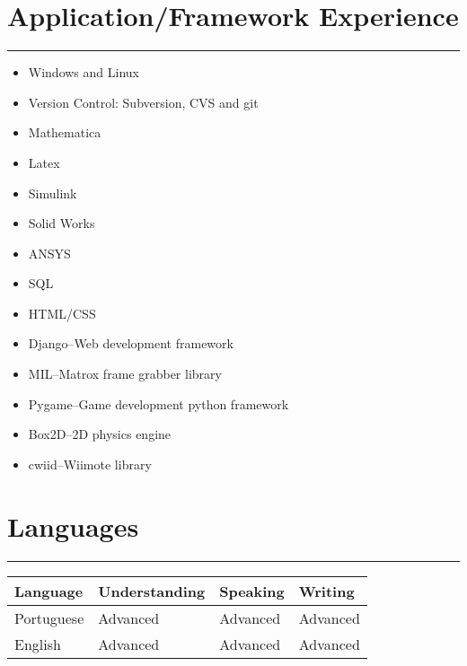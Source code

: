 \documentclass[a4paper,english]{article}
\newcommand{\topic}[1]{
\section*{#1} \vspace{-6mm}
\rule{\columnwidth}{.25mm}
}
\begin{document}
\topic{Application/Framework Experience}
\begin{itemize}
\setlength{\itemsep}{-1mm}
    \item Windows and Linux
    \item Version Control: Subversion, CVS and git
    \item Mathematica
    \item Latex
    \item Simulink
    \item Solid Works
    \item ANSYS
    \item SQL
    \item HTML/CSS
    \item Django--Web development framework
    \item MIL--Matrox frame grabber library
    \item Pygame--Game development python framework
    \item Box2D--2D physics engine
    \item cwiid--Wiimote library
\end{itemize}

\topic{Languages}

\begin{tabular}{llll}
Language & Understanding & Speaking & Writing \\
\hline
Portuguese & Advanced & Advanced & Advanced \\
English & Advanced & Advanced & Advanced \\
\end{tabular}
\end{document}
